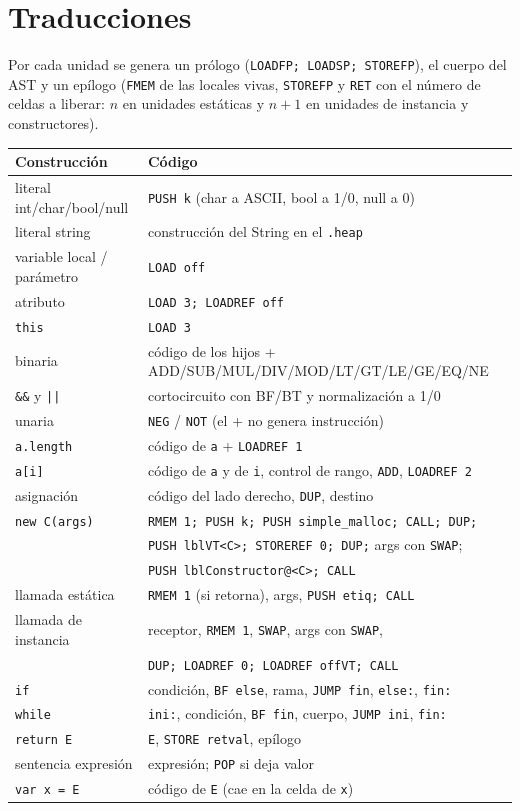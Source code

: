 \documentclass[11pt,a4paper]{article}
\begin{document}
\section{Traducciones}

Por cada unidad se genera un prólogo (\texttt{LOADFP; LOADSP; STOREFP}), el
cuerpo del AST y un epílogo (\texttt{FMEM} de las locales vivas,
\texttt{STOREFP} y \texttt{RET} con el número de celdas a liberar: $n$ en
unidades estáticas y $n+1$ en unidades de instancia y constructores).

\begin{center}
\footnotesize
\begin{tabular}{ll}
\hline
Construcción & Código \\
\hline
literal int/char/bool/null & \texttt{PUSH k} (char a ASCII, bool a 1/0, null a 0) \\
literal string & construcción del String en el \texttt{.heap} \\
variable local / parámetro & \texttt{LOAD off} \\
atributo & \texttt{LOAD 3; LOADREF off} \\
\texttt{this} & \texttt{LOAD 3} \\
binaria & código de los hijos + ADD/SUB/MUL/DIV/MOD/LT/GT/LE/GE/EQ/NE \\
\texttt{\&\&} y \texttt{||} & cortocircuito con BF/BT y normalización a 1/0 \\
unaria & \texttt{NEG} / \texttt{NOT} (el + no genera instrucción) \\
\texttt{a.length} & código de \texttt{a} + \texttt{LOADREF 1} \\
\texttt{a[i]} & código de \texttt{a} y de \texttt{i}, control de rango, \texttt{ADD}, \texttt{LOADREF 2} \\
asignación & código del lado derecho, \texttt{DUP}, destino \\
\texttt{new C(args)} & \texttt{RMEM 1; PUSH k; PUSH simple\_malloc; CALL; DUP;} \\
 & \texttt{PUSH lblVT<C>; STOREREF 0; DUP;} args con \texttt{SWAP}; \\
 & \texttt{PUSH lblConstructor@<C>; CALL} \\
llamada estática & \texttt{RMEM 1} (si retorna), args, \texttt{PUSH etiq; CALL} \\
llamada de instancia & receptor, \texttt{RMEM 1}, \texttt{SWAP}, args con \texttt{SWAP}, \\
 & \texttt{DUP; LOADREF 0; LOADREF offVT; CALL} \\
\texttt{if} & condición, \texttt{BF else}, rama, \texttt{JUMP fin}, \texttt{else:}, \texttt{fin:} \\
\texttt{while} & \texttt{ini:}, condición, \texttt{BF fin}, cuerpo, \texttt{JUMP ini}, \texttt{fin:} \\
\texttt{return E} & \texttt{E}, \texttt{STORE retval}, epílogo \\
sentencia expresión & expresión; \texttt{POP} si deja valor \\
\texttt{var x = E} & código de \texttt{E} (cae en la celda de \texttt{x}) \\
\hline
\end{tabular}
\end{center}
\end{document}
